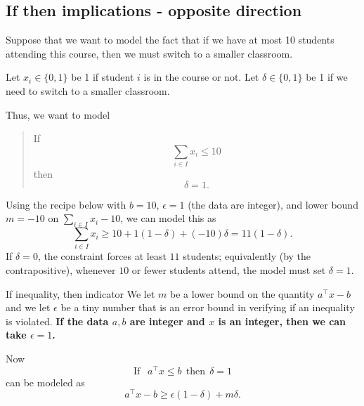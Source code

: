 \subsection{If then implications - opposite direction}
Suppose that we want to model the fact that if we have at most 10 students attending this course, then we must switch to a smaller classroom.   

Let $x_i \in \{0,1\}$ be 1 if student $i$ is in the course or not.   Let $\delta \in \{0,1\}$ be 1 if we need to switch to a smaller classroom.  

Thus, we want to model 
\begin{quote}
If $$
\sum_{i \in I} x_i \leq 10
$$
then 
$$
\delta = 1.
$$
\end{quote}

Using the recipe below with $b = 10$, $\epsilon = 1$ (the data are integer), and lower bound $m = -10$ on $\sum_{i \in I} x_i - 10$, we can model this as
\begin{equation}
\sum_{i \in I} x_i \geq 10 + 1(1-\delta) + (-10)\delta = 11(1 - \delta).
\end{equation}
If $\delta = 0$, the constraint forces at least $11$ students; equivalently (by the contrapositive), whenever $10$ or fewer students attend, the model must set $\delta = 1$.


\begin{general}{If inequality, then indicator}{}
We let $m$ be a lower bound on the quantity $a^\top x - b$ and we let $\epsilon$ be a tiny number that is an error bound in verifying if an inequality is violated.  \textbf{If the data $a,b$ are integer and $x$ is an integer, then we can take $\epsilon = 1$.}

Now
\begin{equation}
\text{If } \ \ a^\top x \leq b  \ \ \text{then}\ \ \delta = 1
\end{equation}
can be modeled as 
\begin{equation}
a^\top x -b  \geq  \epsilon(1-\delta) + m \delta.
\end{equation}
\end{general}



